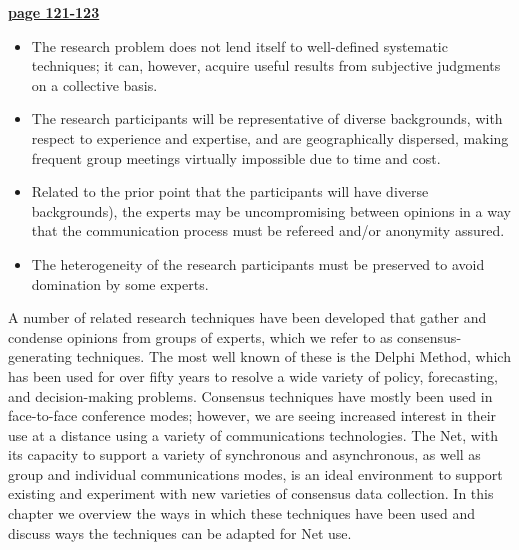 \documentclass[a4]{article}
\begin{document}
\begin{center}
	\underline{\textbf{	 page 121-123}}
\end{center}

\begin{itemize}
	\item 
	The research problem does not lend itself to well-defined systematic techniques; it can, however, acquire useful results from subjective judgments on a collective basis. 
	\item
	The research participants will be representative of diverse backgrounds, with respect to experience and expertise, and are geographically dispersed, making frequent group meetings virtually impossible due to time and cost.
	\item
	Related to the prior point that the participants will have diverse backgrounds), the experts may be uncompromising between opinions in a way that the communication process must be refereed and/or anonymity assured. 
	\item
	The heterogeneity of the research participants must be preserved to avoid domination by some experts.
\end{itemize}



A number of related research techniques have been developed that gather and condense opinions from groups of experts, which we refer to as consensus-generating techniques. The most well known of these is the Delphi Method, which has been used for over fifty years to resolve a wide variety of policy, forecasting, and decision-making problems. Consensus techniques have mostly been used in face-to-face conference modes; however, we are seeing increased interest in their use at a distance using a variety of communications technologies. The Net, with its capacity to support a variety of synchronous and asynchronous, as well as group and individual communications modes, is an ideal environment to support existing and experiment with new varieties of consensus data collection. In this chapter we overview the ways in which these techniques have been used and discuss ways the techniques can be adapted for Net use.
\end{document}
